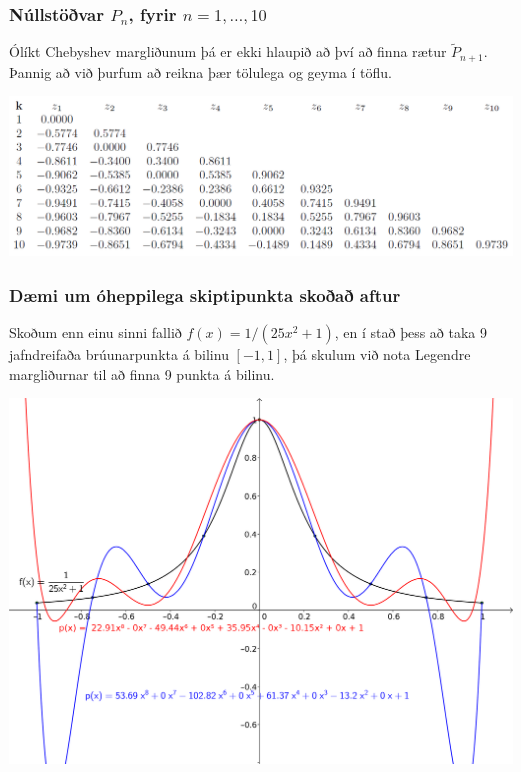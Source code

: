 \documentclass[a4paper,10pt,icelandic]{sphinxmanual}
\begin{document}
\subsubsection{Núllstöðvar \(P_n\), fyrir \(n=1,\ldots,10\)}
\label{kafli03:nullstovar-fyrir}
Ólíkt Chebyshev margliðunum þá er ekki hlaupið að því að finna rætur
\(\tilde P_{n+1}\). Þannig að við þurfum að reikna þær tölulega og
geyma í töflu.

\includegraphics{legendre.png}


\subsubsection{Dæmi um óheppilega skiptipunkta skoðað aftur}
\label{kafli03:id7}
Skoðum enn einu sinni fallið \(f(x) = 1/(25x^2+1)\), en í stað þess
að taka 9 jafndreifaða brúunarpunkta á bilinu \([-1,1]\), þá skulum
við nota Legendre margliðurnar til að finna 9 punkta á bilinu.

\includegraphics{vond_bruun3.png}
\end{document}
